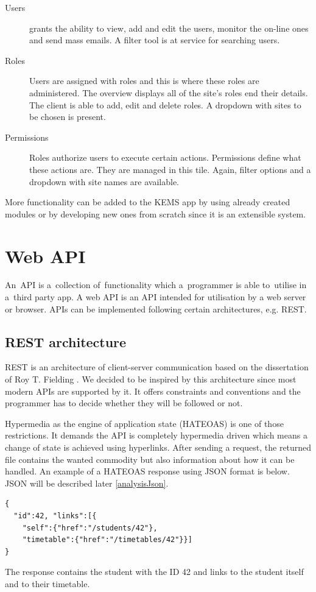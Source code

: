 \begin{description}
\begin {description}
	\item [Users] grants the ability to view, add and edit the users, monitor the on-line ones and send mass emails. A filter tool is at service for searching users.
	\item [Roles] Users are assigned with roles and this is where these roles are administered. The overview displays all of the site's roles end their details. The client is able to add, edit and delete roles. A dropdown with sites to be chosen is present. 
	\item [Permissions] Roles authorize users to execute certain actions. Permissions define what these actions are. They are managed in this tile. Again, filter options and a dropdown with site names are available. 
	\end{description}
\end{description}
More functionality can be added to the KEMS app by using already created modules or by developing new ones from scratch since it is an extensible system.

\section{Web API} \label{analysisWebAPI}
An~API is a~collection of~functionality which a~programmer is able to~utilise in a~third party app. A web API is an API intended for utilisation by a web server or browser. APIs can be implemented following certain architectures, e.g. REST.
\subsection{REST architecture} \label{analysisREST} \cite{rest}
REST is an architecture of client-server communication based on the dissertation of Roy T. Fielding \cite{restDissertation}. We decided to be inspired by this architecture since most modern APIs are supported by it. It offers constraints and conventions and the programmer has to decide whether they will be followed or not. 

\cite{hateoas} Hypermedia as the engine of application state (HATEOAS) is one of those restrictions. It demands the API is completely hypermedia driven which means a change of state is achieved using hyperlinks. After sending a request, the returned file contains the wanted commodity but also information about how it can be handled. An example of a HATEOAS response using JSON format is below. JSON will be described later \ref{analysisJson}.
\lstset{style=sharpc, numbers=none}
\begin{lstlisting}
{
  "id":42, "links":[{ 
	"self":{"href":"/students/42"}, 
	"timetable":{"href":"/timetables/42"}}]
}
\end{lstlisting}
The response contains the student with the ID 42 and links to the student itself and to their timetable. 

